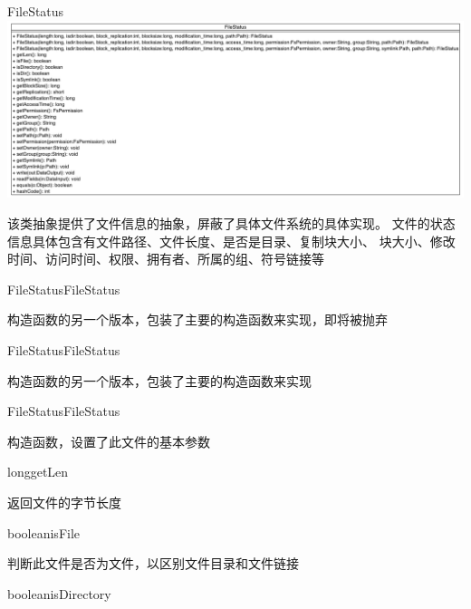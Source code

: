 \begin{XeClass}{FileStatus}
\includegraphics[width=\textwidth]{cdig/FileStatus.png}
     
 该类抽象提供了文件信息的抽象，屏蔽了具体文件系统的具体实现。
 文件的状态信息具体包含有文件路径、文件长度、是否是目录、复制块大小、
 块大小、修改时间、访问时间、权限、拥有者、所属的组、符号链接等

    \begin{XeMethod}{\XePublic}{FileStatus}{FileStatus}
         
 构造函数的另一个版本，包装了主要的构造函数来实现，即将被抛弃

    \end{XeMethod}

    \begin{XeMethod}{\XePublic}{FileStatus}{FileStatus}
         
 构造函数的另一个版本，包装了主要的构造函数来实现

    \end{XeMethod}

    \begin{XeMethod}{\XePublic}{FileStatus}{FileStatus}
         
 构造函数，设置了此文件的基本参数

    \end{XeMethod}

    \begin{XeMethod}{\XePublic}{long}{getLen}
         
 返回文件的字节长度

    \end{XeMethod}

    \begin{XeMethod}{\XePublic}{boolean}{isFile}
         
 判断此文件是否为文件，以区别文件目录和文件链接

    \end{XeMethod}

    \begin{XeMethod}{\XePublic}{boolean}{isDirectory}
         

\end{XeMethod}
\end{XeClass}
